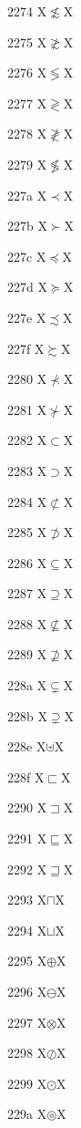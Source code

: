 \documentclass[11pt]{article}
\begin{document}
2274 X{\ensuremath{\nlesssim}}X

2275 X{\ensuremath{\ngtrsim}}X

2276 X{\ensuremath{\lessgtr}}X

2277 X{\ensuremath{\gtrless}}X

2278 X{\ensuremath{\ngtrless}}X

2279 X{\ensuremath{\nlessgtr}}X

227a X{\ensuremath{\prec}}X

227b X{\ensuremath{\succ}}X

227c X{\ensuremath{\preccurlyeq}}X

227d X{\ensuremath{\succcurlyeq}}X

227e X{\ensuremath{\precsim}}X

227f X{\ensuremath{\succsim}}X

2280 X{\ensuremath{\nprec}}X

2281 X{\ensuremath{\nsucc}}X

2282 X{\ensuremath{\subset}}X

2283 X{\ensuremath{\supset}}X

2284 X{\ensuremath{\nsubset}}X

2285 X{\ensuremath{\nsupset}}X

2286 X{\ensuremath{\subseteq}}X

2287 X{\ensuremath{\supseteq}}X

2288 X{\ensuremath{\nsubseteq}}X

2289 X{\ensuremath{\nsupseteq}}X

228a X{\ensuremath{\subsetneq}}X

228b X{\ensuremath{\supsetneq}}X

228e X{\ensuremath{\uplus}}X

228f X{\ensuremath{\sqsubset}}X

2290 X{\ensuremath{\sqsupset}}X

2291 X{\ensuremath{\sqsubseteq}}X

2292 X{\ensuremath{\sqsupseteq}}X

2293 X{\ensuremath{\sqcap}}X

2294 X{\ensuremath{\sqcup}}X

2295 X{\ensuremath{\oplus}}X

2296 X{\ensuremath{\ominus}}X

2297 X{\ensuremath{\otimes}}X

2298 X{\ensuremath{\oslash}}X

2299 X{\ensuremath{\odot}}X

229a X{\ensuremath{\circledcirc}}X
\end{document}
